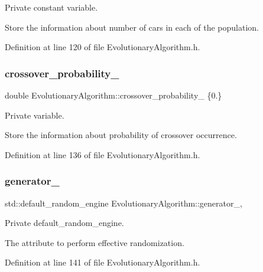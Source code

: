 Private constant variable. 

Store the information about number of cars in each of the population. 

Definition at line 120 of file Evolutionary\+Algorithm.\+h.

\mbox{\label{classEvolutionaryAlgorithm_a815be8b2644e2d1bdc6378c88ab03da3}} 
\subsubsection{\texorpdfstring{crossover\+\_\+probability\+\_\+}{crossover\_probability\_}}
{\footnotesize\ttfamily double Evolutionary\+Algorithm\+::crossover\+\_\+probability\+\_\+ \{0.\}\hspace{0.3cm}{\ttfamily [private]}}



Private variable. 

Store the information about probability of crossover occurrence. 

Definition at line 136 of file Evolutionary\+Algorithm.\+h.

\mbox{\label{classEvolutionaryAlgorithm_adbd823d385ad95bf20496fd2fc25ccde}} 
\subsubsection{\texorpdfstring{generator\+\_\+}{generator\_}}
{\footnotesize\ttfamily std\+::default\+\_\+random\+\_\+engine Evolutionary\+Algorithm\+::generator\+\_\+\hspace{0.3cm}{\ttfamily [mutable]}, {\ttfamily [private]}}



Private default\+\_\+random\+\_\+engine. 

The attribute to perform effective randomization. 

Definition at line 141 of file Evolutionary\+Algorithm.\+h.

\mbox{\label{classEvolutionaryAlgorithm_a85d23b07f2b2c8b1df581a9566111fa7}} 
